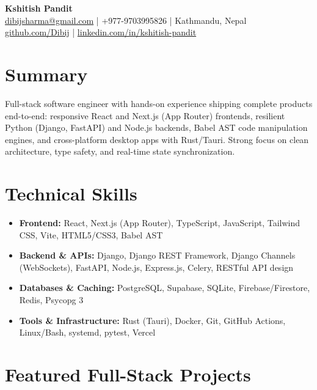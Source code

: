 \documentclass[a4paper,10pt]{article}
\begin{document}
\begin{center}
    {\LARGE \textbf{Kshitish Pandit}} \\[4pt]
    \href{mailto:dibijsharma@gmail.com}{dibijsharma@gmail.com} \quad | \quad +977-9703995826 \quad | \quad Kathmandu, Nepal \\[2pt]
    \href{https://github.com/Dibij}{github.com/Dibij} \quad | \quad
    \href{https://www.linkedin.com/in/kshitish-pandit}{linkedin.com/in/kshitish-pandit}
\end{center}

\vspace{2pt}

\section*{Summary}
Full-stack software engineer with hands-on experience shipping complete products end-to-end: responsive React and Next.js (App Router) frontends, resilient Python (Django, FastAPI) and Node.js backends, Babel AST code manipulation engines, and cross-platform desktop apps with Rust/Tauri. Strong focus on clean architecture, type safety, and real-time state synchronization.

\section*{Technical Skills}
\begin{itemize}
    \item \textbf{Frontend:} React, Next.js (App Router), TypeScript, JavaScript, Tailwind CSS, Vite, HTML5/CSS3, Babel AST
    \item \textbf{Backend \& APIs:} Django, Django REST Framework, Django Channels (WebSockets), FastAPI, Node.js, Express.js, Celery, RESTful API design
    \item \textbf{Databases \& Caching:} PostgreSQL, Supabase, SQLite, Firebase/Firestore, Redis, Psycopg 3
    \item \textbf{Tools \& Infrastructure:} Rust (Tauri), Docker, Git, GitHub Actions, Linux/Bash, systemd, pytest, Vercel
\end{itemize}

\section*{Featured Full-Stack Projects}
\end{document}
